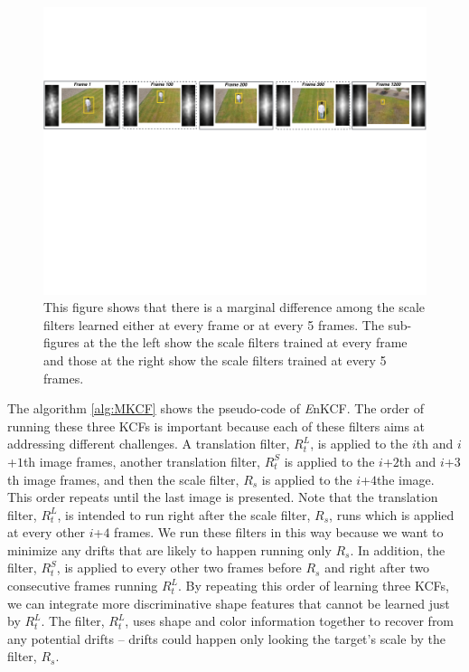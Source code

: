 \documentclass[10pt,twocolumn,letterpaper]{article}
\begin{document}
\begin{figure}[!h]
\centering
\includegraphics[width=1\textwidth]{./figures/LearnedFiltersComparison2.pdf}
\caption{This figure shows that there is a marginal difference among
  the scale filters learned either at every frame or at every 5
  frames. The sub-figures at the the left show the scale filters
  trained at every frame and those at the right show the scale filters
  trained at every 5 frames.}
\label{fig:Filters_Comparison}
\end{figure}

The algorithm \ref{alg:MKCF} shows the pseudo-code of {\it E}nKCF.
The order of running these three KCFs is important because each of
these filters aims at addressing different challenges. A translation
filter, $R_{t}^{L}$, is applied to the $i$th and $i$+$1$th image
frames, another translation filter, $R_{t}^{S}$ is applied to the
$i$+$2$th and $i$+$3$th image frames, and then the scale filter,
$R_{s}$ is applied to the $i$+$4$the image. This order repeats until
the last image is presented. Note that the translation filter,
$R_{t}^{L}$, is intended to run right after the scale filter, $R_s$,
runs which is applied at every other $i$+$4$ frames. We run these
filters in this way because we want to minimize any drifts that are
likely to happen running only $R_{s}$. In addition, the filter,
$R_{t}^{S}$, is applied to every other two frames before $R_{s}$ and
right after two consecutive frames running $R_{t}^{L}$. By repeating
this order of learning three KCFs, we can integrate more
discriminative shape features that cannot be learned just by
$R_{t}^{L}$. The filter, $R_{t}^{L}$, uses shape and color information
together to recover from any potential drifts -- drifts could happen
only looking the target's scale by the filter, $R_{s}$.
\end{document}
